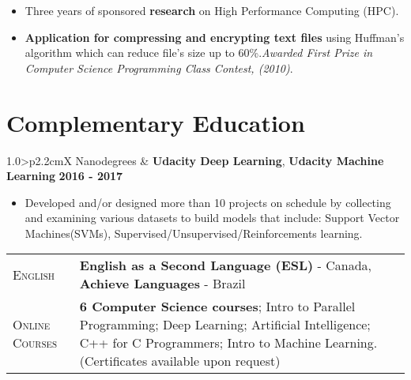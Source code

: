 \documentclass[9pt, a4paper, oneside, final]{scrartcl} %
\newcommand{\gray}{\rowcolor[gray]{.90}} %
\begin{document}
\begin{itemize}\itemsep1.0pt \parskip0pt 

\item Three years of sponsored \textbf{research} on High Performance Computing (HPC).

\item \textbf{Application for compressing and encrypting text files} using Huffman's algorithm which can reduce file’s size up to 60\%.\textit{Awarded First Prize in Computer Science Programming Class Contest, (2010)}.


\end{itemize}

\section{Complementary Education}

\begin{center}
\begin{tabularx}{1.0\linewidth}{>{\raggedleft\scshape}p{2.2cm}X}
\gray Nanodegrees & \textbf{Udacity Deep Learning}, \textbf{Udacity Machine Learning} \hfill \textbf{2016 - 2017}\\
\end{tabularx}
\end{center}

\begin{itemize}
\item Developed and/or designed more than 10 projects on schedule by collecting and examining various datasets to build models that include: Support Vector Machines(SVMs), Supervised/Unsupervised/Reinforcements learning.
\end{itemize}


\begin{center}
\begin{tabularx}{1.0\linewidth}{>{\raggedleft\scshape}p{2.0cm}X}
\gray English & \textbf{English as a Second Language (ESL)} - Canada, 
          \textbf{Achieve Languages} - Brazil\\
\gray Online Courses & \textbf{6 Computer Science courses}; Intro to Parallel Programming; Deep Learning; Artificial Intelligence; C++ for C Programmers; Intro to Machine Learning. (Certificates available upon request)
\end{tabularx}
\end{center}
\end{document}
